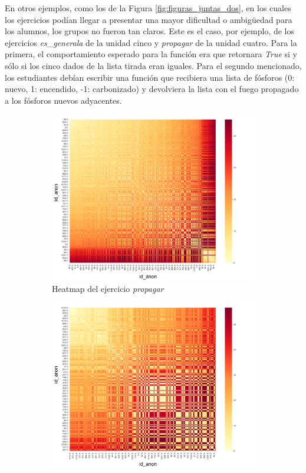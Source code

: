 \documentclass[11pt,a4paper,twoside,openany]{tesis}
\begin{document}
En otros ejemplos, como los de la Figura \ref{fig:figuras_juntas_dos}, en los cuales los ejercicios podían llegar a presentar una mayor dificultad o ambigüedad para los alumnos, los grupos no fueron tan claros. Este es el caso, por ejemplo, de los ejercicios \emph{es\_generala} de la unidad cinco y \emph{propagar} de la unidad cuatro. Para la primera, el comportamiento esperado para la función era que retornara \emph{True} si y sólo si los cinco dados de la lista tirada eran iguales. Para el segundo mencionado, los estudiantes debían escribir una función que recibiera una lista de fósforos (0: nuevo, 1: encendido, -1: carbonizado) y devolviera la lista con el fuego propagado a los fósforos nuevos adyacentes.

\begin{figure}[H]
    \centering
    \begin{subfigure}{0.45\textwidth}
        \includegraphics[width=\linewidth]{imagenes/heatmap-1-propagar.png}
        \caption{Heatmap del ejercicio \emph{propagar}}
        \label{fig:figura1}
    \end{subfigure}
    \hfill
    \begin{subfigure}{0.45\textwidth}
        \includegraphics[width=\linewidth]{imagenes/heatmap-1-prob generala.png}

\end{subfigure}
\end{figure}
\end{document}
